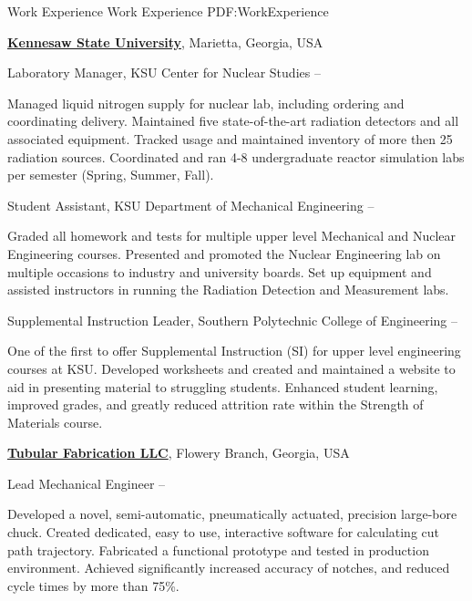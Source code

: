 \documentclass[letterpaper,MMMyyyy,nonstopmode]{simpleresumecv}
\begin{document}
\begin{Body}

\Section
{Work Experience}
{Work Experience}
{PDF:WorkExperience}

\Entry
\href{http://kennesaw.edu/}
{\textbf{Kennesaw State University}},
Marietta, Georgia, USA

\Gap
\BulletItem
Laboratory Manager,
KSU Center for Nuclear Studies
\hfill
{} --
\begin{Detail}
\SubBulletItem
Managed liquid nitrogen supply for nuclear lab, including ordering and coordinating delivery.
\SubBulletItem
Maintained five state-of-the-art radiation detectors and all associated equipment.
\SubBulletItem
Tracked usage and maintained inventory of more then 25 radiation sources.
\SubBulletItem
Coordinated and ran 4-8 undergraduate reactor simulation labs per semester (Spring, Summer, Fall).
\end{Detail}

\Gap
\BulletItem
Student Assistant,
KSU Department of Mechanical Engineering
\hfill
{} --
\begin{Detail}
\SubBulletItem
Graded all homework and tests for multiple upper level Mechanical and Nuclear Engineering courses.
\SubBulletItem
Presented and promoted the Nuclear Engineering lab on multiple occasions to industry and university boards.
\SubBulletItem
Set up equipment and assisted instructors in running the Radiation Detection and Measurement labs.
\end{Detail}

\Gap
\BulletItem
Supplemental Instruction Leader,
Southern Polytechnic College of Engineering
\hfill
{} --
\begin{Detail}
\SubBulletItem
One of the first to offer Supplemental Instruction (SI) for upper level engineering courses at KSU.
\SubBulletItem
Developed worksheets and created and maintained a website to aid in presenting material to struggling students.
\SubBulletItem
Enhanced student learning, improved grades, and greatly reduced attrition rate within the Strength of Materials course.
\end{Detail}


\BigGap
\Entry
\href{http://tubularfab.com}
{\textbf{Tubular Fabrication LLC}},
Flowery Branch, Georgia, USA

\Gap
\BulletItem
Lead Mechanical Engineer
\hfill
{} --
\begin{Detail}
\SubBulletItem
Developed a novel, semi-automatic, pneumatically actuated, precision large-bore chuck.
\SubBulletItem
Created dedicated, easy to use, interactive software for calculating cut path trajectory.
\SubBulletItem
Fabricated a functional prototype and tested in production environment.
\SubBulletItem
Achieved significantly increased accuracy of notches, and reduced cycle times by more than 75\%.
\end{Detail}



\end{Body}
\end{document}
